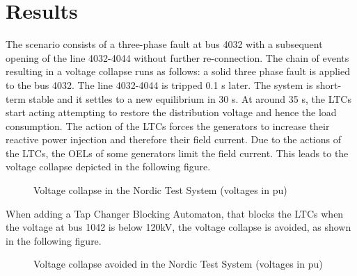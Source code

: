 \documentclass[a4paper, 12pt]{report}
\begin{document}
\section{Results}

The scenario consists of a three-phase fault at bus 4032 with a subsequent opening of the line 4032-4044 without further re-connection.
The chain of events resulting in a voltage collapse runs as follows: a solid three phase fault is applied to the bus 4032. The line 4032-4044 is tripped 0.1 s later. The system is short-term stable and it settles to a new equilibrium in 30 s. At around 35 s, the LTCs start acting attempting to restore the distribution voltage and hence the load consumption. The action of the LTCs forces the generators to increase their reactive power injection and therefore their field current. Due to the actions of the LTCs, the OELs of some generators limit the field current. This leads to the voltage collapse depicted in the following figure.

\begin{figure}[H]
\caption{Voltage collapse in the Nordic Test System (voltages in pu)}
\end{figure}

When adding a Tap Changer Blocking Automaton, that blocks the LTCs when the voltage at bus 1042 is below 120kV, the voltage collapse is avoided, as shown in the following figure.

\begin{figure}[H]
\caption{Voltage collapse avoided in the Nordic Test System (voltages in pu)}
\end{figure}
\end{document}
